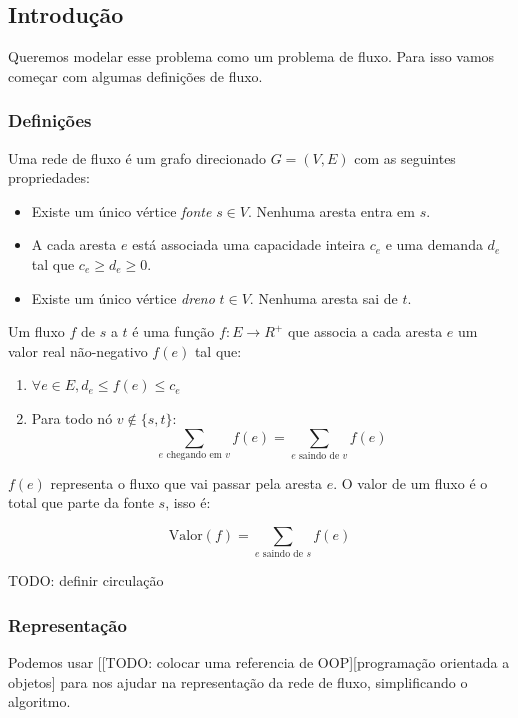 \documentclass[11pt]{article}
\begin{document}
\subsection{Introdução}
\label{sec-1-2}

Queremos modelar esse problema como um problema de fluxo. Para isso
vamos começar com algumas definições de fluxo.

\subsubsection{Definições}
\label{sec-1-2-1}

Uma rede de fluxo é um grafo direcionado $G =
(V, E)$ com as seguintes propriedades:
\begin{itemize}
\item Existe um único vértice \textit{fonte} $s \in V$. Nenhuma aresta entra em $s$.
\item A cada aresta $e$ está associada uma capacidade inteira $c_e$ e
uma demanda $d_e$ tal que $c_e \geq d_e \geq 0$.
\item Existe um único vértice \textit{dreno} $t \in V$. Nenhuma aresta sai de $t$.
\end{itemize}

Um fluxo $f$ de $s$ a $t$ é uma função $f \colon E \to R^+$ que associa a cada
aresta $e$ um valor real não-negativo $f(e)$ tal que:

\begin{enumerate}
\item $\forall e \in E, d_e \leq f(e) \leq c_e$
\item Para todo nó $v \not\in \{s,t\}$:
\[ \sum_{e \text{ chegando em } v} f(e) = \sum_{e \text{ saindo de } v} f(e) \]
\end{enumerate}

$f(e)$ representa o fluxo que vai passar pela aresta $e$. O valor de
um fluxo é o total que parte da fonte $s$, isso é:

$$\label{valor_fluxo} \mathrm{Valor}(f) = \sum_{e \text{ saindo de } s} f(e) $$

TODO: definir circulação
\subsubsection{Representação}
\label{sec-1-2-2}

Podemos usar [[TODO: colocar uma referencia de OOP][programação orientada a objetos]
para nos ajudar na representação da rede de fluxo,
simplificando o algoritmo.
\end{document}
